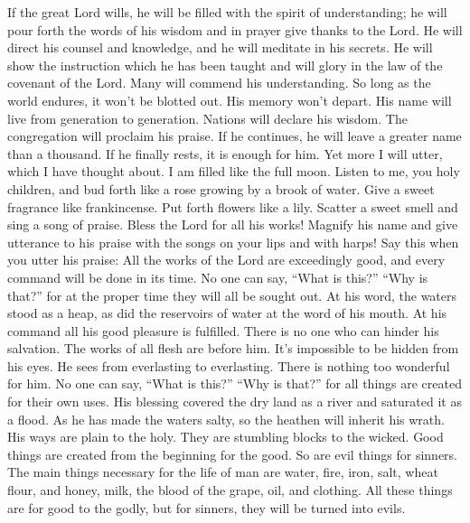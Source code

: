  If the great Lord wills, he will be filled with the spirit
of understanding; he will pour forth the words of his wisdom and in
prayer give thanks to the Lord.  He will direct his counsel
and knowledge, and he will meditate in his secrets.  He will
show the instruction which he has been taught and will glory in the law
of the covenant of the Lord.  Many will commend his
understanding. So long as the world endures, it won't be blotted out.
His memory won't depart. His name will live from generation to
generation.  Nations will declare his wisdom. The
congregation will proclaim his praise.  If he continues, he
will leave a greater name than a thousand. If he finally rests, it is
enough for him.  Yet more I will utter, which I have
thought about. I am filled like the full moon.  Listen to
me, you holy children, and bud forth like a rose growing by a brook of
water.  Give a sweet fragrance like frankincense. Put forth
flowers like a lily. Scatter a sweet smell and sing a song of praise.
Bless the Lord for all his works!  Magnify his name and
give utterance to his praise with the songs on your lips and with harps!
Say this when you utter his praise:  All the works of the
Lord are exceedingly good, and every command will be done in its time.
 No one can say, ``What is this?'' ``Why is that?'' for at
the proper time they will all be sought out. At his word, the waters
stood as a heap, as did the reservoirs of water at the word of his
mouth.  At his command all his good pleasure is fulfilled.
There is no one who can hinder his salvation.  The works of
all flesh are before him. It's impossible to be hidden from his eyes.
 He sees from everlasting to everlasting. There is nothing
too wonderful for him.  No one can say, ``What is this?''
``Why is that?'' for all things are created for their own uses.
 His blessing covered the dry land as a river and saturated
it as a flood.  As he has made the waters salty, so the
heathen will inherit his wrath.  His ways are plain to the
holy. They are stumbling blocks to the wicked.  Good things
are created from the beginning for the good. So are evil things for
sinners.  The main things necessary for the life of man are
water, fire, iron, salt, wheat flour, and honey, milk, the blood of the
grape, oil, and clothing.  All these things are for good to
the godly, but for sinners, they will be turned into evils.

